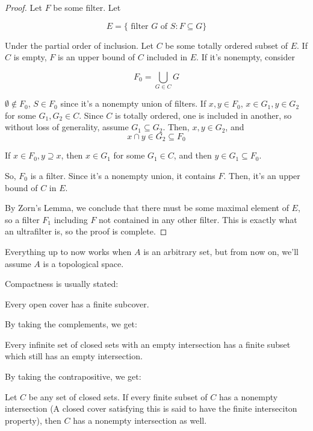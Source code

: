 \documentclass{article}
\begin{document}
        \begin{proof}
        Let $F$ be some filter. Let

        \[E = \{\text{ filter } G \text{ of } S: F \subseteq G\}\]

        Under the partial order of inclusion. Let $C$ be some totally ordered
        subset of $E$. If $C$ is empty, $F$ is an upper bound of $C$ included in
        $E$. If it's nonempty, consider

        \[F_0 = \bigcup_{G \in C} G\]

        $\emptyset \notin F_0$, $S \in F_0$ since it's a nonempty union of
        filters. If $x, y \in F_0$, $x \in G_1, y \in G_2$ for some $G_1, G_2
        \in C$. Since $C$ is totally ordered, one is included in another, so
        without loss of generality, assume $G_1 \subseteq G_2$. Then, $x,y \in
        G_2$, and \[x \cap y \in G_2 \subseteq F_0\]

        If $x \in F_0, y \supseteq x$, then $x \in G_1$ for some $G_1 \in C$,
        and then $y \in G_1 \subseteq F_0$.

        So, $F_0$ is a filter. Since it's a nonempty union, it contains $F$.
        Then, it's an upper bound of $C$ in $E$.

        By Zorn's Lemma, we conclude that there must be some maximal element of
        $E$, so a filter $F_1$ including $F$ not contained in any other filter.
        This is exactly what an ultrafilter is, so the proof is complete.
        \end{proof}

        Everything up to now works when $A$ is an arbitrary set, but from now
        on, we'll assume $A$ is a topological space.

        Compactness is usually stated:

        Every open cover has a finite subcover.

        By taking the complements, we get:

        Every infinite set of closed sets with an empty intersection has a
        finite subset which still has an empty intersection.

        By taking the contrapositive, we get:

        Let $C$ be any set of closed sets. If every finite subset of $C$ has
        a nonempty intersection (A closed cover satisfying this is said to have
        the finite interseciton property), then $C$ has a nonempty intersection
        as well.
\end{document}
